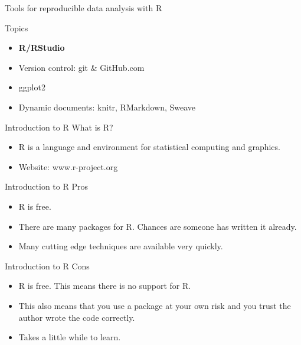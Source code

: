 \documentclass[table]{beamer}\usepackage[]{graphicx}\usepackage[]{color}
\begin{document}
\begin{frame}{Tools for reproducible data analysis with R}

\begin{block}{Topics}
\begin{itemize}
        \item \textbf{R/RStudio}
       \item Version control: git \& GitHub.com
         \item ggplot2
        \item Dynamic documents: knitr, RMarkdown, Sweave
 \end{itemize}
\end{block}

\end{frame}



\begin{frame}{Introduction to R}
What is R?
\begin{itemize}
\item R is a language and environment for statistical computing and graphics. 
\item Website: www.r-project.org
\end{itemize}
\end{frame}

\begin{frame}{Introduction to R}
Pros
\begin{itemize}
\item R is free.
\item There are many packages for R.  Chances are someone has written it already. 
\item Many cutting edge techniques are available very quickly.  
\end{itemize}
\end{frame}


\begin{frame}{Introduction to R}
Cons
\begin{itemize}
\item R is free.  This means there is no support for R.  
\item This also means that you use a package at your own risk and you trust the author wrote the code correctly.  
\item Takes a little while to learn.
\end{itemize}
\end{frame}
\end{document}
